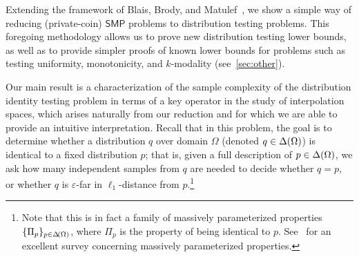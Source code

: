 \documentclass[11pt]{article}
\theoremstyle{remark}   	\newtheorem{remark}[theorem]{Remark}
\theoremstyle{definition}   	\newaliascnt{defn}{theorem}
\newcommand{\eps}{\ensuremath{\varepsilon}\xspace}
\newcommand{\lp}[1][1]{\ell_{#1}}
\newcommand{\SMP}{\ensuremath{\mathsf{SMP}}}
\begin{document}
Extending the framework of Blais, Brody, and Matulef~\cite{BBM12}, we show a simple way of reducing (private-coin) $\SMP$ problems to distribution testing problems. This foregoing methodology allows us to prove new distribution testing lower bounds, as well as to provide simpler proofs of known lower bounds for problems such as testing uniformity, monotonicity, and $k$-modality (see~\autoref{sec:other}). 

Our main result is a characterization of the sample complexity of the distribution identity testing problem in terms of a key operator in the study of interpolation spaces, which arises naturally from our reduction and for which we are able to provide an intuitive interpretation. Recall that in this problem, the goal is to determine whether a distribution $q$ over domain $\Omega$ (denoted $q\in\Delta\!\left(\Omega\right)$) is identical to a fixed distribution $p$; that is, given a full description of $p\in\Delta\!\left(\Omega\right)$, we ask how many independent samples from $q$ are needed to decide whether $q=p$, or whether $q$ is $\eps$-far in $\lp[1]$-distance from $p$.\footnote{Note that this is in fact a family of massively parameterized properties $\{\Pi_p\}_{p\in\Delta\!\left(\Omega\right)}$, where $\Pi_p$ is the property of being identical to $p$. See~\cite{Newman10} for an excellent survey concerning massively parameterized properties.}
\end{document}
